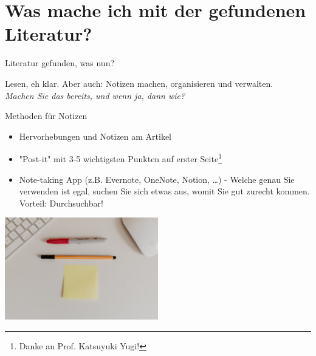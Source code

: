 \documentclass{beamer}
\begin{document}





\section{Was mache ich mit der gefundenen Literatur?}

\begin{frame}{Literatur gefunden, was nun?}

\pause

Lesen, eh klar. \pause Aber auch: Notizen machen, organisieren und verwalten.  \\

\emph{Machen Sie das bereits, und wenn ja, dann wie?}

    
\end{frame}

\begin{frame}{Methoden für Notizen}

\begin{itemize}
    \item 
Hervorhebungen und Notizen am Artikel
\item 
"Post-it" mit 3-5 wichtigsten Punkten auf erster Seite\footnote{Danke an Prof. Katsuyuki Yugi!}
    \item
    Note-taking App (z.B. Evernote, OneNote, Notion, \dots) - Welche genau Sie verwenden ist egal, suchen Sie sich etwas aus, womit Sie gut zurecht kommen. Vorteil: Durchsuchbar!
\end{itemize}

\begin{center}
    \includegraphics[width=0.5\textwidth]{kelly-sikkema-QtSDRxvZHQc-unsplash.jpg}
\end{center}

\end{frame}
\end{document}
